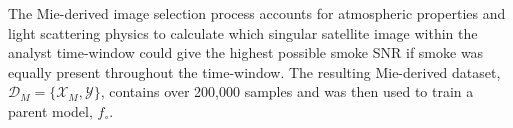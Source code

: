 \documentclass{article}
\begin{document}
The Mie-derived image selection process accounts for atmospheric properties and light scattering physics to calculate which singular satellite image within the analyst time-window could give the highest possible smoke SNR if smoke was equally present throughout the time-window. The resulting Mie-derived dataset, \(\mathcal{D}_M = \{\mathcal{X}_M, \mathcal{Y}\}\), contains over 200,000 samples and was then used to train a parent model, \(f_{\circ}\). 


\end{document}
